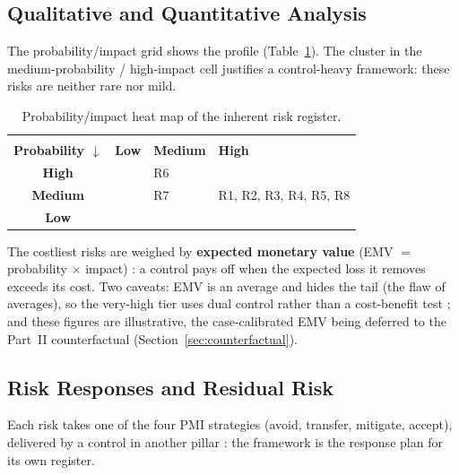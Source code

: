 \documentclass[12pt,a4paper]{article}
\begin{document}
\subsection{Qualitative and Quantitative Analysis}

The probability/impact grid \cite{falchi_slides} shows the profile (Table~\ref{tab:heatmap}). The cluster in the medium-probability / high-impact cell justifies a control-heavy framework: these risks are neither rare nor mild.

\begin{table}[H]
\centering
\small
{}
\begin{tabular}{@{} c >{\centering\arraybackslash}p{2.3cm} >{\centering\arraybackslash}p{2.3cm} >{\centering\arraybackslash}p{3.6cm} @{}}
\toprule
 & \multicolumn{3}{c}{\textbf{\color{accentdark}Impact} $\rightarrow$} \\
\textbf{\color{accentdark}Probability $\downarrow$} & \textbf{Low} & \textbf{Medium} & \textbf{High} \\
\midrule
\textbf{High}   & \cellcolor{heatmed} & \cellcolor{heathigh} R6 & \cellcolor{heathigh} \\
\textbf{Medium} & \cellcolor{heatlow} & \cellcolor{heatmed} R7 & \cellcolor{heathigh} R1, R2, R3, R4, R5, R8 \\
\textbf{Low}    & \cellcolor{heatlow} & \cellcolor{heatlow} & \cellcolor{heatmed} \\
\bottomrule
\end{tabular}
\caption{Probability/impact heat map of the inherent risk register.}
\label{tab:heatmap}
\end{table}

The costliest risks are weighed by \textbf{expected monetary value} (EMV $=$ probability $\times$ impact) \cite{falchi_slides}: a control pays off when the expected loss it removes exceeds its cost. Two caveats: EMV is an average and hides the tail (the flaw of averages), so the very-high tier uses dual control rather than a cost-benefit test \cite{falchi_slides}; and these figures are illustrative, the case-calibrated EMV being deferred to the Part~II counterfactual (Section~\ref{sec:counterfactual}).

\subsection{Risk Responses and Residual Risk}

Each risk takes one of the four PMI strategies (avoid, transfer, mitigate, accept), delivered by a control in another pillar \cite{falchi_slides}: the framework is the response plan for its own register.
\end{document}
